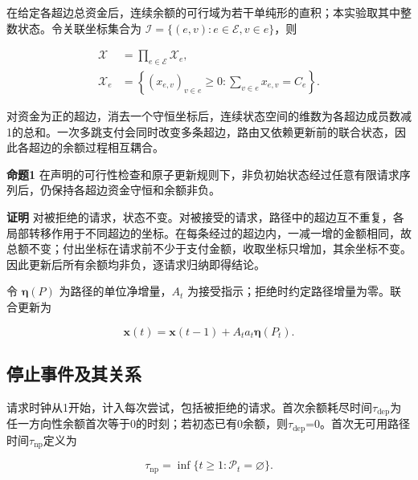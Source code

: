 \documentclass[UTF8,a4paper,twocolumn,fontset=none,zihao=5]{ctexart}
\begin{document}
在给定各超边总资金后，连续余额的可行域为若干单纯形的直积；本实验取其中整数状态。令关联坐标集合为 $\mathcal I=\{(e,v):e\in\mathcal E,v\in e\}$，则



\begin{equation}
\begin{aligned}\mathcal X&=\prod_{e\in\mathcal E}\mathcal X_e,\\\mathcal X_e&=\left\{(x_{e,v})_{v\in e}\geq0:\sum_{v\in e}x_{e,v}=C_e\right\}.\end{aligned}
\label{eq:3}\end{equation}


对资金为正的超边，消去一个守恒坐标后，连续状态空间的维数为各超边成员数减1的总和。一次多跳支付会同时改变多条超边，路由又依赖更新前的联合状态，因此各超边的余额过程相互耦合。


\noindent\textbf{命题1} 在声明的可行性检查和原子更新规则下，非负初始状态经过任意有限请求序列后，仍保持各超边资金守恒和余额非负。\par

\noindent\textbf{证明} 对被拒绝的请求，状态不变。对被接受的请求，路径中的超边互不重复，各局部转移作用于不同超边的坐标。在每条经过的超边内，一减一增的金额相同，故总额不变；付出坐标在请求前不少于支付金额，收取坐标只增加，其余坐标不变。因此更新后所有余额均非负，逐请求归纳即得结论。\par

令 $\boldsymbol\eta(P)$ 为路径的单位净增量，$A_t$ 为接受指示；拒绝时约定路径增量为零。联合更新为



\begin{equation}
\boldsymbol x(t)=\boldsymbol x(t-1)+A_ta_t\boldsymbol\eta(P_t).
\label{eq:4}\end{equation}


\subsection{停止事件及其关系}

请求时钟从1开始，计入每次尝试，包括被拒绝的请求。首次余额耗尽时间$\tau_{\mathrm{dep}}$为任一方向性余额首次等于0的时刻；若初态已有0余额，则$\tau_{\mathrm{dep}}$=0。首次无可用路径时间$\tau_{\mathrm{np}}$定义为



\begin{equation}
\tau_{\mathrm{np}}=\inf\{t\geq1:\mathcal P_t=\varnothing\}.
\label{eq:5}\end{equation}
\end{document}
